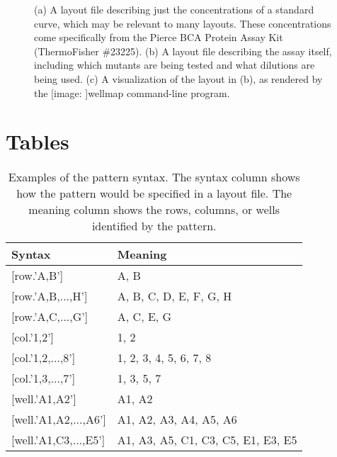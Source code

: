 \documentclass[twocolumn]{bmcart}
\def\texttt{[image: ]}
\begin{document}
\begin{backmatter}
\begin{figure}[h!]
  \caption{\label{fig:bradford}%
     (a)
    A layout file describing just the concentrations of a standard curve, which
    may be relevant to many layouts. These concentrations come specifically
    from the Pierce BCA Protein Assay Kit (ThermoFisher \#23225). (b) A layout
    file describing the assay itself, including which mutants are being tested
    and what dilutions are being used.  (c) A visualization of the layout in
    (b), as rendered by the \texttt{wellmap} command-line program.}
\end{figure}


\section*{Tables}

\begin{table}[h!]

  \caption{\label{tab:pattern-syntax}
    Examples of the pattern syntax. The syntax column shows how the pattern
    would be specified in a layout file.  The meaning column shows the rows,
    columns, or wells identified by the pattern.}

  \begin{tabular}{ll}
  \toprule 
  Syntax & Meaning\\
  \midrule 
  {[}row.'A,B'{]} & A, B\\
  {[}row.'A,B,...,H'{]} & A, B, C, D, E, F, G, H\\
  {[}row.'A,C,...,G'{]} & A, C, E, G\\
  \midrule 
  {[}col.'1,2'{]} & 1, 2\\
  {[}col.'1,2,...,8'{]} & 1, 2, 3, 4, 5, 6, 7, 8\\
  {[}col.'1,3,...,7'{]} & 1, 3, 5, 7\\
  \midrule 
  {[}well.'A1,A2'{]} & A1, A2\\
  {[}well.'A1,A2,...,A6'{]} & A1, A2, A3, A4, A5, A6\\
  {[}well.'A1,C3,...,E5'{]} & A1, A3, A5, C1, C3, C5, E1, E3, E5\\
  \bottomrule
  \end{tabular}

\end{table}

\end{backmatter}
\end{document}
